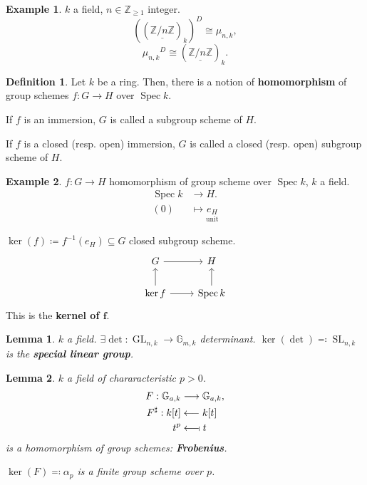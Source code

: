 \documentclass[12pt]{article}
\DeclareMathOperator{\Spec}{Spec}
\DeclareMathOperator{\GL}{GL}
\DeclareMathOperator{\SL}{SL}
\newtheorem*{lemma}{Lemma}
\theoremstyle{definition}
\newtheorem*{definition}{Definition}
\newtheorem*{example}{Example}
\begin{document}
\begin{example}
$k$ a field, $n\in\mathbb Z_{\geq1}$ integer.
\[\left((\underline{\mathbb Z/n\mathbb Z})_k\right)^D\cong\mu_{n,k},\]
\[{\mu_{n,k}}^D\cong(\underline{\mathbb Z/n\mathbb Z})_k.\]
\end{example}

\begin{definition}
Let $k$ be a ring. Then, there is a notion of \textbf{homomorphism} of group schemes $f:G\rightarrow H$ over $\Spec k$.

If $f$ is an immersion, $G$ is called a subgroup scheme of $H$.

If $f$ is a closed (resp. open) immersion, $G$ is called a closed (resp. open) subgroup scheme of $H$.
\end{definition}

\begin{example}
$f:G\rightarrow H$ homomorphism of group scheme over $\Spec k$, $k$ a field.
\begin{align*}
\Spec k&\longrightarrow H.\\(0)&\longmapsto\underset{\text{unit}}{e_H}
\end{align*}

$\ker(f)\coloneqq f^{-1}(e_H)\subseteq G$ closed subgroup scheme.
\[\begin{tikzcd}G\arrow[r]&H\\\ker f\arrow[u]\arrow[r]&\Spec k\arrow[u]\end{tikzcd}\]
This is the \textbf{kernel of $\boldsymbol f$}.
\end{example}

\begin{lemma}
$k$ a field. $\exists\det:\GL_{n,k}\rightarrow\mathbb G_{m,k}$ determinant. $\ker(\det)\eqqcolon\SL_{n,k}$ is the \textbf{special linear group}.
\end{lemma}

\begin{lemma}
$k$ a field of chararacteristic $p>0$.
\begin{align*}
F:\mathbb G_{a,k}&\longrightarrow\mathbb G_{a,k},\\F^\sharp:k[t]&\longleftarrow k[t]\\t^p&\longleftarrow\!\shortmid t
\end{align*}
is a homomorphism of group schemes: \textbf{Frobenius}.

$\ker(F)\eqqcolon\alpha_p$ is a finite group scheme over $p$.
\end{lemma}
\end{document}
